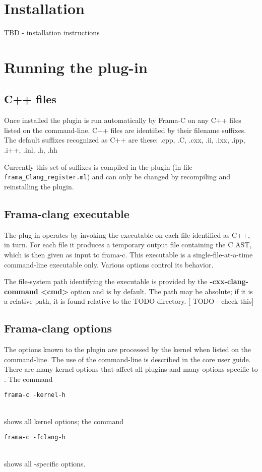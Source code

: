 

\chapter{Installation}

TBD - installation instructions

\chapter{Running the plug-in}

\section{C++ files}
Once installed the plugin is run automatically by Frama-C on any C++ files listed on the command-line. C++ files are identified by their filename suffixes. The default suffixes recognized as C++ are these:
 .cpp, .C, .cxx, .ii, .ixx, .ipp, .i++, .inl, .h, .hh

Currently this set of suffixes is compiled in the plugin (in file \texttt{frama\_Clang\_register.ml}) and can only be changed by recompiling and
reinstalling the plugin.

\section{Frama-clang executable}
The plug-in operates by invoking the executable \irg
on each file identified as C++, in turn. 
For each file it produces a temporary output file containing the C AST, which is then given as input to frama-c. This executable is a single-file-at-a-time command-line executable only. 
Various options control its behavior.

The file-system path identifying the executable is provided by the \textbf{-cxx-clang-command <cmd>}
option and is \irg by default. The path may be absolute; if it is a relative path, it is found relative to the TODO directory. [ TODO - check this]


\section{Frama-clang options}

The options known to the \fcl plugin are processed by the \fc kernel when listed on the \fc command-line. 
The use of the \fc command-line is described in the core \fc 
user guide.
There are many kernel options that affect all plugins and many options specific to \fclang.
The command \\
\centerline{\lstinline|frama-c -kernel-h|} \\
shows all kernel options; the command\\
\centerline{\lstinline|frama-c -fclang-h|} \\
shows all \fcl-specific options.

